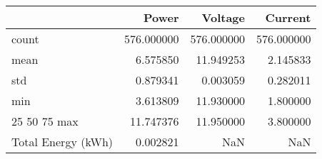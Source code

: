 \begin{tabular}{lrrr}
\toprule
 & Power & Voltage & Current \\
\midrule
count & 576.000000 & 576.000000 & 576.000000 \\
mean & 6.575850 & 11.949253 & 2.145833 \\
std & 0.879341 & 0.003059 & 0.282011 \\
min & 3.613809 & 11.930000 & 1.800000 \\
25%
50%
75%
max & 11.747376 & 11.950000 & 3.800000 \\
Total Energy (kWh) & 0.002821 & NaN & NaN \\
\bottomrule
\end{tabular}
